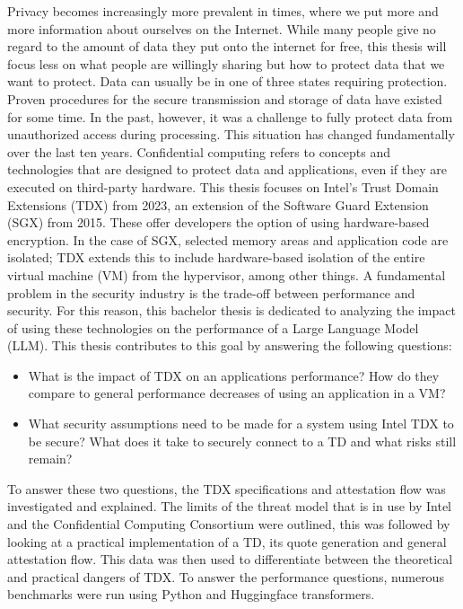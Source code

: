 Privacy becomes increasingly more prevalent in times, where we put more and more information about ourselves on the Internet. While many people give no regard to the amount of data they put onto the internet for free, this thesis will focus less on what people are willingly sharing but how to protect data that we want to protect. Data can usually be in one of three states requiring protection. Proven procedures for the secure transmission and storage of data have existed for some time. In the past, however, it was a challenge to fully protect data from unauthorized access during processing. This situation has changed fundamentally over the last ten years. Confidential computing refers to concepts and technologies that are designed to protect data and applications, even if they are executed on third-party hardware. This thesis focuses on Intel's Trust Domain Extensions (TDX) from 2023, an extension of the Software Guard Extension (SGX) from 2015. These offer developers the option of using hardware-based encryption. In the case of SGX, selected memory areas and application code are isolated; TDX extends this to include hardware-based isolation of the entire virtual machine (VM) from the hypervisor, among other things. 
A fundamental problem in the security industry is the trade-off between performance and security. For this reason, this bachelor thesis is dedicated to analyzing the impact of using these technologies on the performance of a Large Language Model (LLM). This thesis contributes to this goal by answering the following questions:
\begin{itemize}
    \item What is the impact of TDX on an applications performance? How do they compare to general performance decreases of using an application in a VM?
\item What security assumptions need to be made for a system using Intel TDX to be secure? What does it take to securely connect to a TD and what risks still remain?
\end{itemize}
To answer these two questions, the TDX specifications and attestation flow was investigated and explained. The limits of the threat model that is in use by Intel and the Confidential Computing Consortium were outlined, this was followed by looking at a practical implementation of a TD, its quote generation and general attestation flow. This data was then used to differentiate between the theoretical and practical dangers of TDX.
To answer the performance questions, numerous benchmarks were run using Python and Huggingface transformers.
